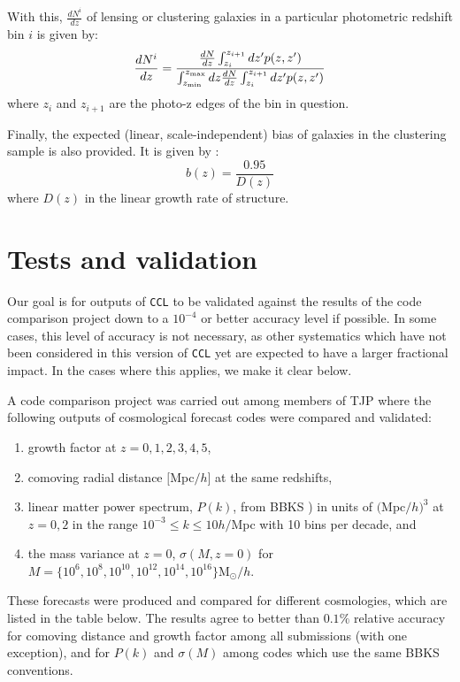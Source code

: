 \documentclass[\docopts]{\docclass}
\begin{document}
With this, $\frac{dN^i}{dz}$ of lensing or clustering galaxies in a particular photometric redshift bin $i$ is given by:
\begin{equation}
\frac{dN^i}{dz} = \frac{\frac{dN}{dz}\int_{z_i}^{z_{i+1}} dz' p(z,z')}{\int_{z_{\rm min}}^{z_{\rm max}}dz \frac{dN}{dz} \int_{z_i}^{z_{i+1}}dz' p(z, z')}
\label{photoz}
\end{equation}
where $z_{i}$ and $z_{i+1}$ are the photo-z edges of the bin in question. 

Finally, the expected (linear, scale-independent) bias of galaxies in the clustering sample is also provided. It is given by \cite{ScienceBook}:
\begin{equation}
b(z) = \frac{0.95}{D(z)}
\label{clustbias}
\end{equation}
where $D(z)$ in the linear growth rate of structure.

\section{Tests and validation}
\label{sec:tests}

Our goal is for outputs of {\tt CCL} to be validated against the results of the code comparison project down to a $10^{-4}$ or better accuracy level if possible. In some cases, this level of accuracy is not necessary, as other systematics which have not been considered in this version of {\tt CCL} yet are expected to have a larger fractional impact. In the cases where this applies, we make it clear below. 

A code comparison project was carried out among members of TJP where the following outputs of cosmological forecast codes were compared and validated:
\begin{enumerate}
\item growth factor at $z = 0,1,2,3,4,5$,
\item comoving radial distance $[$Mpc$/h]$ at the same redshifts, 
\item linear matter power spectrum, $P(k)$, from BBKS \citealt{BBKS}) in units of $($Mpc$/h)^3$ at $z=0,2$ in the range $10^{-3} \leq k \leq 10 h/$Mpc with 10 bins per decade, and
\item the mass variance at $z=0$, $\sigma(M,z=0)$ for $M =\{10^6, 10^8, 10^{10}, 10^{12}, 10^{14}, 10^{16}\} $M$_\odot/h$.
\end{enumerate}
These forecasts were produced and compared for different cosmologies, which are listed in the table below. The results agree to better than $0.1\%$ relative accuracy for comoving distance and growth factor among all submissions (with one exception), and for $P(k)$ and $\sigma(M)$ among codes which use the same BBKS conventions. 
\end{document}
